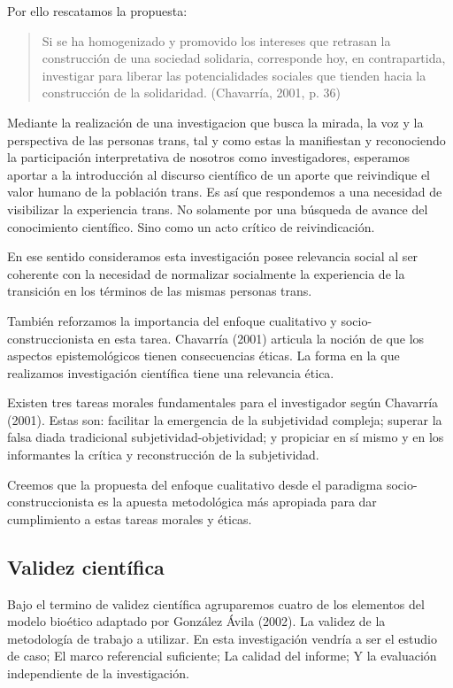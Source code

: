 Por ello rescatamos la propuesta:

\begin{quote}
    Si se ha homogenizado y promovido los intereses que retrasan la construcción de
    una sociedad solidaria, corresponde hoy, en contrapartida, investigar para
    liberar las potencialidades sociales que tienden hacia la construcción de la
    solidaridad. (Chavarría, 2001, p. 36)
\end{quote}

Mediante la realización de una investigacion que busca la mirada,
la voz y la perspectiva de las personas trans, tal y como estas la
manifiestan y reconociendo la participación interpretativa de nosotros como
investigadores, esperamos aportar a la introducción al discurso científico de
un aporte que reivindique el valor humano de la población trans.
Es así que respondemos a una necesidad de visibilizar la experiencia trans.
No solamente por una búsqueda de avance del conocimiento científico.
Sino como un acto crítico de reivindicación.

En ese sentido consideramos esta investigación posee relevancia social al ser
coherente con la necesidad de normalizar socialmente la experiencia de la
transición en los términos de las mismas personas trans.

También reforzamos la importancia del enfoque cualitativo y
socio-construccionista en esta tarea.
Chavarría (2001) articula la noción de que los aspectos epistemológicos
tienen consecuencias éticas.
La forma en la que realizamos investigación científica tiene una relevancia
ética.

Existen tres tareas morales fundamentales para el investigador según
Chavarría (2001).
Estas son: facilitar la emergencia de la subjetividad compleja;
superar la falsa diada tradicional subjetividad-objetividad;
y propiciar en sí mismo y en los informantes la crítica y reconstrucción de
la subjetividad.

Creemos que la propuesta del enfoque cualitativo desde el paradigma
socio-construccionista es la apuesta metodológica más apropiada para dar
cumplimiento a estas tareas morales y éticas.

\subsection{Validez científica}
Bajo el termino de validez científica agruparemos cuatro de los elementos del
modelo bioético adaptado por González Ávila (2002).
La validez de la metodología de trabajo a utilizar.
En esta investigación vendría a ser el estudio de caso;
El marco referencial suficiente;
La calidad del informe;
Y la evaluación independiente de la investigación.

